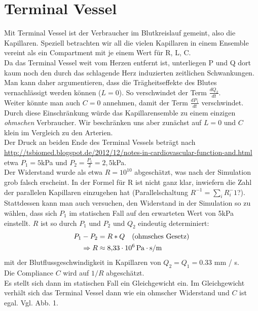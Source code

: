 \documentclass[a4paper,12pt]{scrartcl}
\begin{document}
\section*{Terminal Vessel}
Mit Terminal Vessel ist der Verbraucher im Blutkreislauf gemeint, also die Kapillaren. Speziell betrachten wir all die vielen Kapillaren in einem Ensemble vereint als ein Compartment mit je einem Wert für R, L, C.\\
Da das Terminal Vessel weit vom Herzen entfernt ist, unterliegen P und Q dort kaum noch den durch das schlagende Herz induzierten zeitlichen Schwankungen. Man kann daher argumentieren, dass die Trägheitseffekte des Blutes vernachlässigt werden können ($L=0$). So verschwindet der Term $\frac{dQ_2}{dt}$.\\
Weiter könnte man auch $C=0$ annehmen, damit der Term $\frac{dP_1}{dt}$ verschwindet. Durch diese Einschränkung würde das Kapillarensemble zu einem einzigen \textit{ohmschen} Verbraucher. Wir beschränken uns aber zunächst auf $L=0$ und $C$ klein im Vergleich zu den Arterien.\\

Der Druck an beiden Ende des Terminal Vessels beträgt nach \url{http://tsbiomed.blogspot.de/2012/12/notes-in-cardiovascular-function-and.html} etwa $P_1 = 5$kPa und $P_2 = \frac{P_1}{2} = 2,5$kPa.\\
Der Widerstand wurde als etwa $R=10^{10}$ abgeschätzt, was nach der Simulation grob falsch erscheint. In der Formel für R ist nicht ganz klar, inwiefern die Zahl der parallelen Kapillaren einzugehen hat (Parallelschaltung $R^{-1} = \sum_i R_i^-1$?). Stattdessen kann man auch versuchen, den Widerstand in der Simulation so zu wählen, dass sich $P_1$ im statischen Fall auf den erwarteten Wert von 5kPa einstellt. $R$ ist so durch $P_1$ und $P_2$ und $Q_2$ eindeutig determiniert:
\begin{align}
  P_1 - P_2 &= R * Q~~~\text{(ohmsches Gesetz)}\\
  \Rightarrow R &\approx \SI{8.33E6}{Pa\cdot s / m}
\end{align} mit der Blutflussgeschwindigkeit in Kapillaren von $Q_2 = Q_1 = 0.33$ mm / s.\\

Die Compliance $C$ wird auf $1/R$ abgeschätzt.\\

Es stellt sich dann im statischen Fall ein Gleichgewicht ein. Im Gleichgewicht verhält sich das Terminal Vessel dann wie ein ohmscher Widerstand und $C$ ist egal. Vgl. Abb. 1.\\
\end{document}
